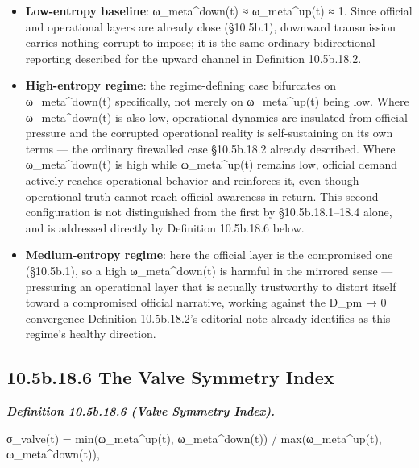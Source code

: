 \documentclass[
]{article}
\begin{document}
\begin{itemize}
\item
  \textbf{Low-entropy baseline}: ω\_meta\^{}down(t) ≈ ω\_meta\^{}up(t) ≈
  1. Since official and operational layers are already close (§10.5b.1),
  downward transmission carries nothing corrupt to impose; it is the
  same ordinary bidirectional reporting described for the upward channel
  in Definition 10.5b.18.2.
\item
  \textbf{High-entropy regime}: the regime-defining case bifurcates on
  ω\_meta\^{}down(t) specifically, not merely on ω\_meta\^{}up(t) being
  low. Where ω\_meta\^{}down(t) is also low, operational dynamics are
  insulated from official pressure and the corrupted operational reality
  is self-sustaining on its own terms --- the ordinary firewalled case
  §10.5b.18.2 already described. Where ω\_meta\^{}down(t) is high while
  ω\_meta\^{}up(t) remains low, official demand actively reaches
  operational behavior and reinforces it, even though operational truth
  cannot reach official awareness in return. This second configuration
  is not distinguished from the first by §10.5b.18.1--18.4 alone, and is
  addressed directly by Definition 10.5b.18.6 below.
\item
  \textbf{Medium-entropy regime}: here the official layer is the
  compromised one (§10.5b.1), so a high ω\_meta\^{}down(t) is harmful in
  the mirrored sense --- pressuring an operational layer that is
  actually trustworthy to distort itself toward a compromised official
  narrative, working against the D\_pm → 0 convergence Definition
  10.5b.18.2's editorial note already identifies as this regime's
  healthy direction.
\end{itemize}

\hypertarget{b.18.6-the-valve-symmetry-index}{%
\subsection{10.5b.18.6 The Valve Symmetry
Index}\label{b.18.6-the-valve-symmetry-index}}

\emph{\textbf{Definition 10.5b.18.6 (Valve Symmetry Index).}}

σ\_valve(t) = min(ω\_meta\^{}up(t), ω\_meta\^{}down(t)) /
max(ω\_meta\^{}up(t), ω\_meta\^{}down(t)),
\end{document}
